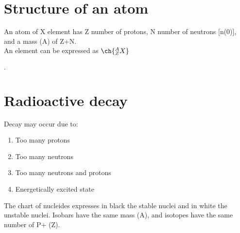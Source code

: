 \section{Structure of an atom}
An atom of X element has Z number of protons, N number of neutrons [n(0)], and a mass (A) of Z+N. \\
An element can be expressed as $\ch{^{A}_{Z}X}$ \par.
\section{Radioactive decay}
Decay may occur due to:
 \begin{enumerate}
	\item Too many protons
	\item Too many neutrons
	\item Too many neutrons and protons
	\item Energetically excited state
\end{enumerate}
The chart of nucleides expresses in black the stable nuclei and in white the unstable nuclei. Isobars have the same mass (A), and isotopes have the same number of P+ (Z).
